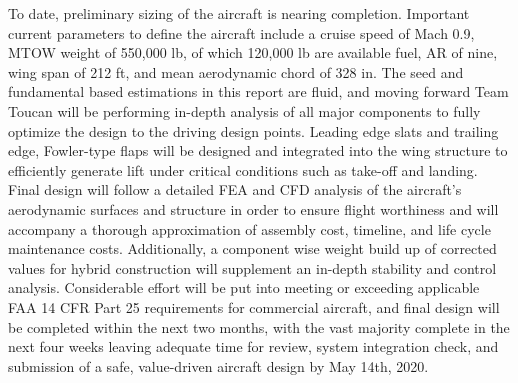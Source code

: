 To date, preliminary sizing of the aircraft is nearing completion.  Important current parameters to define the aircraft include a cruise speed of Mach 0.9, MTOW weight of 550,000 lb, of which 120,000 lb are available fuel, AR of nine, wing span of 212 ft, and mean aerodynamic chord of 328 in. The seed and fundamental based estimations in this report are fluid, and moving forward Team Toucan will be performing in-depth analysis of all major components to fully optimize the design to the driving design points.  Leading edge slats and trailing edge,  Fowler-type flaps will be designed and integrated into the wing structure to efficiently generate lift under critical conditions such as take-off and landing.  Final design will follow a detailed FEA and CFD analysis of the aircraft's aerodynamic surfaces and structure in order to ensure flight worthiness and will accompany a thorough approximation of assembly cost, timeline, and life cycle maintenance costs.  Additionally, a component wise weight build up of corrected values for hybrid construction will supplement an in-depth stability and control analysis.  Considerable effort will be put into meeting or exceeding applicable FAA 14 CFR Part 25 requirements for commercial aircraft, and final design will be completed within the next two months, with the vast majority complete in the next four weeks leaving adequate time for review, system integration check, and submission of a safe, value-driven aircraft design by May 14th, 2020.

